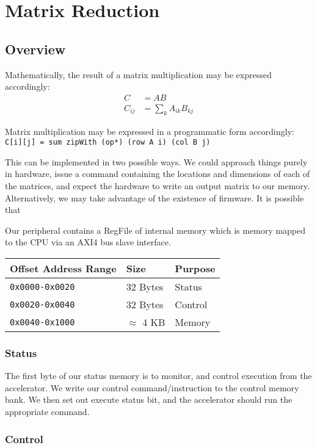 \documentclass[a4paper,9pt]{report}
\begin{document}
\section{Matrix Reduction}
\subsection{Overview}

Mathematically, the result of a matrix multiplication may be expressed
accordingly:
\begin{align*}
  C &= AB \\
  C_{ij} &= \sum_k A_{ik}B_{kj}
\end{align*}

Matrix multiplication may be expressed in a programmatic form accordingly:
\texttt{C[i][j] = sum zipWith (op*) (row A i) (col B j)}

This can be implemented in two possible ways.
We could approach things purely in hardware, issue a command containing the
locations and dimensions of each of the matrices, and expect the hardware to
write an output matrix to our memory.
Alternatively, we may take advantage of the existence of firmware. It is
possible that 

Our peripheral contains a RegFile of internal memory which is memory mapped to
the CPU via an AXI4 bus slave interface.

\begin{tabular}{lll}
  \toprule
  Offset Address Range & Size & Purpose \\
  \midrule
  \texttt{0x0000-0x0020} & 32 Bytes & Status \\
  \texttt{0x0020-0x0040} & 32 Bytes & Control \\
  \texttt{0x0040-0x1000} & $\approx$ 4 KB & Memory \\
  \bottomrule
\end{tabular}

\subsubsection{Status}
The first byte of our status memory is to monitor, and control execution from
the accelerator.
We write our control command/instruction to the control memory bank. We then set out
execute status bit, and the accelerator should run the appropriate command.

\subsubsection{Control}
\end{document}
